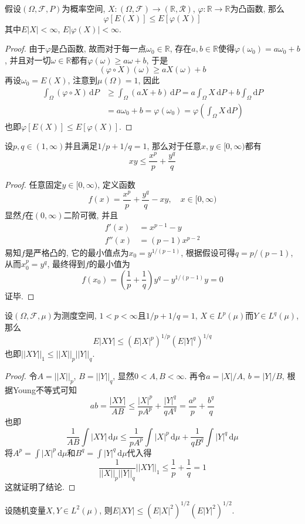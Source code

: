 \documentclass[cn, 12pt, math=mtpro2, bibstyle=apa, blue, twocol]{elegantbook}
\newcommand{\F}{\mathcal{F}}
\newcommand{\R}{\mathbb{R}}
\newcommand{\du}{\,\text{d}\mu}
\begin{document}
\begin{theorem}[Jensen不等式]
  假设$(\Omega,\F,P)$为概率空间, $X:(\Omega,\F)\to(\R,\mathcal{R})$, $\varphi:\R\to\R$为凸函数, 那么
  $$\varphi[E(X)]\leq E[\varphi(X)]$$
  其中$E|X|<\infty$, $E|\varphi(X)|<\infty$.
\end{theorem}
\begin{proof}
   由于$\varphi$是凸函数, 故而对于每一点$\omega_0\in\R$, 存在$a, b\in\R$使得$\varphi(\omega_0)=a\omega_0+b$, 并且对一切$\omega\in\R$都有$\varphi(\omega)\geq a\omega+b$, 于是
   $$(\varphi\circ X)(\omega)\geq aX(\omega)+b$$
   再设$ \omega_0=E(X)$, 注意到$\mu(\Omega)=1$, 因此
   \begin{align*}
   \int_{\Omega} (\varphi\circ X)\,\text{d}P&\geq\int_{\Omega} (aX+b)\,\text{d}P=a\int_{\Omega} X\,\text{d}P+b\int_{\Omega}\text{d}P \\
   &=a\omega_0+b=\varphi(\omega_0)=\varphi\left(\int_{\Omega} X\,\text{d}P\right)
   \end{align*}
   也即$\varphi[E(X)]\leq E[\varphi(X)]$.
 \end{proof}
 \begin{lemma}[Young不等式]
 设$p,q\in (1,\infty)$并且满足$1/p+1/q=1$, 那么对于任意$x,y\in[0,\infty)$都有
 $$xy\leq \frac{x^p}{p}+\frac{y^q}{q}$$
 \end{lemma}
 \begin{proof}
   任意固定$y\in[0,\infty)$, 定义函数
   $$f(x)=\frac{x^p}{p}+\frac{y^q}{q}-xy,\quad x\in[0,\infty)$$
   显然$f$在$(0,\infty)$二阶可微, 并且
   \begin{align*}
   f'(x)&=x^{p-1}-y \\
   f''(x)&=(p-1)x^{p-2}
   \end{align*}
   易知$f$是严格凸的, 它的最小值点为$x_0=y^{1/(p-1)}$, 根据假设可得$q=p/(p-1)$, 从而$x_0^p=y^q$, 最终得到$f$的最小值为
   $$f(x_0)=\left(\frac{1}{p}+\frac{1}{q}\right)y^q-y^{1/(p-1)}y=0$$
   证毕.
 \end{proof}

 \begin{theorem}[Hölder不等式]
  设$(\Omega,\F,\mu)$为测度空间, $1<p<\infty$且$1/p+1/q=1$, $X\in L^p(\mu)$而$Y\in L^q(\mu)$, 那么
  $$E|XY|\leq (E|X|^p)^{1/p}(E|Y|^q)^{1/q}$$
  也即$||XY||_1\leq ||X||_p||Y||_q$.
\end{theorem}
\begin{proof}
  令$A=||X||_p$, $B=||Y||_q$, 显然$0<A,B<\infty$. 再令$a=|X|/A$, $b=|Y|/B$, 根据Young不等式可知
  $$ab=\frac{|XY|}{AB}\leq\frac{|X|^p}{pA^p}+\frac{|Y|^q}{qA^q}=\frac{a^p}{p}+\frac{b^q}{q}$$
  也即
  $$\frac{1}{AB}\int|XY|\,\text{d}\mu\leq\frac{1}{pA^p}\int|X|^p\du+\frac{1}{qB^q}\int|Y|^q\du$$
  将$ A^p=\int|X|^p\du$和$B^q=\int|Y|^q\du$代入得
  $$\frac{1}{||X||_p||Y||_q}||XY||_1\leq\frac{1}{p}+\frac{1}{q}=1$$
  这就证明了结论.

\end{proof}
\begin{corollary}
设随机变量$X,Y\in L^2(\mu)$, 则$E|XY|\leq (E|X|^2)^{1/2}(E|Y|^2)^{1/2}$.
\end{corollary}
\end{document}
